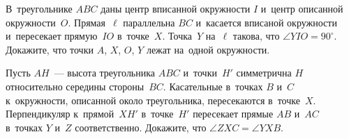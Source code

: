 \begin{problems}
\item
В~треугольнике $ABC$ даны центр вписанной окружности $I$ и~центр описанной
окружности~$O$.
Прямая~$\ell$ параллельна $BC$ и~касается вписаной окружности и~пересекает
прямую~$IO$ в~точке~$X$.
Точка~$Y$ на~$\ell$ такова, что $\angle YIO = 90^{\circ}$.
Докажите, что точки $A$, $X$, $O$, $Y$ лежат на~одной окружности.

\item
Пусть $AH$~--- высота треугольника $ABC$ и~точки~$H'$ симметрична $H$
относительно середины стороны~$BC$.
Касательные в~точках $B$ и~$C$ к~окружности, описанной около треугольника,
пересекаются в~точке~$X$.
Перпендикуляр к~прямой~$XH'$ в~точке~$H'$ пересекает прямые $AB$ и~$AC$
в~точках $Y$ и~$Z$ соответственно.
Докажите, что $\angle ZXC = \angle YXB$.

\end{problems}

